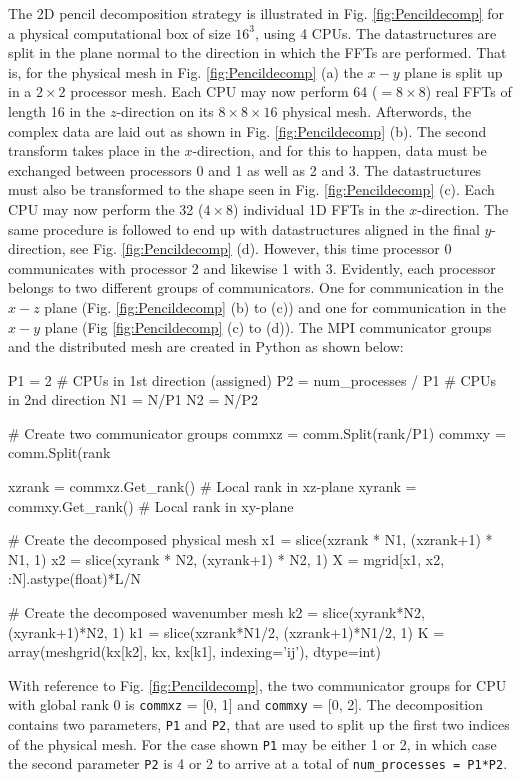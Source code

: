 \documentclass[11pt, oneside]{article}
\newcommand{\inpyth}{\lstinline[style=pythonstyle, basicstyle=\ttfamily]} %[]%
\begin{document}
The 2D pencil decomposition strategy is illustrated in Fig. \ref{fig:Pencildecomp} for a physical computational box of size $16^3$, using 4 CPUs. The datastructures are split in the plane normal to the direction in which the FFTs are performed. That is, for the physical mesh in Fig. \ref{fig:Pencildecomp} (a) the $x-y$ plane is split up in a $2\times2$ processor mesh. Each CPU may now perform 64 ($= 8 \times 8$) real FFTs of length 16 in the $z$-direction on its $8 \times 8 \times 16$ physical mesh. Afterwords, the complex data are laid out as shown in Fig. \ref{fig:Pencildecomp} (b). The second transform takes place in the $x$-direction, and for this to happen, data must be exchanged between processors 0 and 1 as well as 2 and 3. The datastructures must also be transformed to the shape seen in Fig. \ref{fig:Pencildecomp} (c). Each CPU may now perform the 32 ($4 \times 8$) individual 1D FFTs in the $x$-direction. The same procedure is followed to end up with datastructures aligned in the final $y$-direction, see Fig. \ref{fig:Pencildecomp} (d). However, this time processor 0 communicates with processor 2 and likewise 1 with 3. Evidently, each processor belongs to two different groups of communicators. One for communication in the $x-z$ plane (Fig. \ref{fig:Pencildecomp} (b) to (c)) and one for communication in the $x-y$ plane (Fig \ref{fig:Pencildecomp} (c) to (d)). The MPI communicator groups and the distributed mesh are created in Python as shown below:

\begin{minipage}{\linewidth}
\begin{python}
P1 = 2                     # CPUs in 1st direction (assigned)
P2 = num_processes / P1    # CPUs in 2nd direction
N1 = N/P1
N2 = N/P2

# Create two communicator groups
commxz = comm.Split(rank/P1)
commxy = comm.Split(rank%
    
xzrank = commxz.Get_rank() # Local rank in xz-plane
xyrank = commxy.Get_rank() # Local rank in xy-plane
    
# Create the decomposed physical mesh
x1 = slice(xzrank * N1, (xzrank+1) * N1, 1)
x2 = slice(xyrank * N2, (xyrank+1) * N2, 1)
X = mgrid[x1, x2, :N].astype(float)*L/N

# Create the decomposed wavenumber mesh
k2 = slice(xyrank*N2, (xyrank+1)*N2, 1)
k1 = slice(xzrank*N1/2, (xzrank+1)*N1/2, 1)
K = array(meshgrid(kx[k2], kx, kx[k1], indexing='ij'), dtype=int)
\end{python}
\end{minipage}
With reference to Fig. \ref{fig:Pencildecomp}, the two communicator groups for CPU with global rank 0 is 
\inpyth{commxz} = [0, 1] and \inpyth{commxy} = [0, 2]. The decomposition contains two parameters, \inpyth{P1} and \inpyth{P2}, that are used to split up the first two indices of the physical mesh. 
For the case shown \inpyth{P1} may be either 1 or 2, in which case the second parameter \inpyth{P2} 
is 4 or 2 to arrive at a total of \inpyth{num_processes = P1*P2}.
\end{document}
